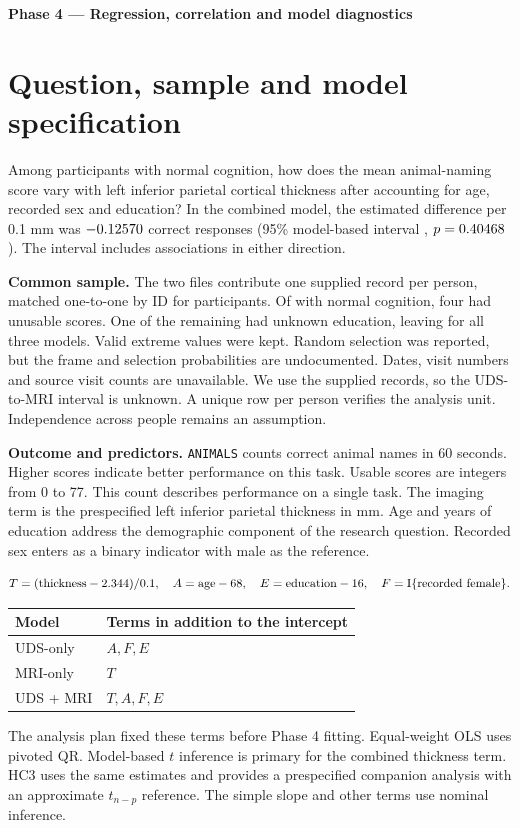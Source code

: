 \documentclass[11pt]{article}
\begin{document}
\par
\vspace{3mm}
\textbf{Phase 4 --- Regression, correlation and model diagnostics}

\section{Question, sample and model specification}\label{sec:design}
Among participants with normal cognition, how does the mean animal-naming score vary with left inferior parietal cortical thickness after accounting for age, recorded sex and education? In the combined model, the estimated difference per 0.1 mm was \(-0.12570\) correct responses (95\% model-based interval \PrimaryInterval{}, \(p=0.40468\)). The interval includes associations in either direction.

\textbf{Common sample.} The two files contribute one supplied record per person, matched one-to-one by ID for \MatchedN{} participants. Of \NormalN{} with normal cognition, four had unusable scores. One of the remaining \PairedN{} had unknown education, leaving \ModelN{} for all three models. Valid extreme values were kept. Random selection was reported, but the frame and selection probabilities are undocumented. Dates, visit numbers and source visit counts are unavailable. We use the supplied records, so the UDS-to-MRI interval is unknown. A unique row per person verifies the analysis unit. Independence across people remains an assumption.

\textbf{Outcome and predictors.} \texttt{ANIMALS} counts correct animal names in 60 seconds. Higher scores indicate better performance on this task. Usable scores are integers from 0 to 77. This count describes performance on a single task. The imaging term is the prespecified left inferior parietal thickness in mm. Age and years of education address the demographic component of the research question. Recorded sex enters as a binary indicator with male as the reference.

\[
 T=(\text{thickness}-2.344)/0.1,\quad A=\text{age}-68,\quad
 E=\text{education}-16,\quad
 F=\mathrm{I}\{\text{recorded female}\}.
\]
\begin{center}\small
\begin{tabular}{@{}ll@{}}\toprule
Model & Terms in addition to the intercept\\\midrule
UDS-only & \(A,F,E\)\\
MRI-only & \(T\)\\
UDS + MRI & \(T,A,F,E\)\\\bottomrule
\end{tabular}
\end{center}
The analysis plan fixed these terms before Phase 4 fitting. Equal-weight OLS uses pivoted QR. Model-based $t$ inference is primary for the combined thickness term. HC3 uses the same estimates and provides a prespecified companion analysis with an approximate $t_{n-p}$ reference. The simple slope and other terms use nominal inference.
\end{document}
